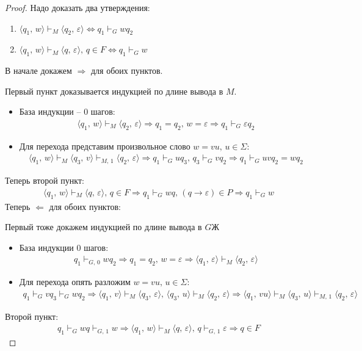 \documentclass[a4paper,12pt]{article}
\theoremstyle{plain}
\theoremstyle{definition}
\theoremstyle{remark}
\begin{document}
\begin{proof}
	Надо доказать два утверждения:
	\begin{enumerate}
		\item $\langle q_1,\, w\rangle \vdash_M \langle q_2,\, \varepsilon\rangle \Leftrightarrow q_1 \vdash_G wq_2$
		\item $\langle q_1,\, w\rangle \vdash_M \langle q,\, \varepsilon\rangle,\, q \in F \Leftrightarrow q_1 \vdash_G w$
	\end{enumerate}
	В начале докажем $\Rightarrow$ для обоих пунктов.

	Первый пункт доказывается индукцией по длине вывода в $M$.
	\begin{itemize}
		\item База индукции -- 0 шагов:
		      \begin{align*}
			      \langle q_1,\, w\rangle \vdash_M \langle q_2,\, \varepsilon\rangle \Rightarrow q_1 = q_2,\, w = \varepsilon \Rightarrow q_1 \vdash_G \varepsilon q_2
		      \end{align*}
		\item Для перехода представим произвольное слово $w = vu,\, u \in \Sigma$:
		      \begin{align*}
			      \langle q_1,\, w\rangle \vdash_M \langle q_3,\, v\rangle \vdash_{M,\, 1} \langle q_2,\, \varepsilon\rangle \Rightarrow q_1 \vdash_G uq_3,\, q_3 \vdash_G vq_2 \Rightarrow q_1 \vdash_G uvq_2 = wq_2
		      \end{align*}
	\end{itemize}
	Теперь второй пункт:
	\begin{align*}
		\langle q_1,\, w \rangle \vdash_M \langle q,\, \varepsilon\rangle,\, q \in F \Rightarrow q_1 \vdash_G wq,\, (q \to \varepsilon) \in P \Rightarrow q_1 \vdash_G w
	\end{align*}
	Теперь $\Leftarrow$ для обоих пунктов:

	Первый тоже докажем индукцией по длине вывода в $G$Ж
	\begin{itemize}
		\item База индукции 0 шагов:
		      \begin{align*}
			      q_1 \vdash_{G,\, 0} wq_2 \Rightarrow q_1 = q_2,\, w = \varepsilon \Rightarrow \langle q_1,\, \varepsilon\rangle \vdash_M \langle q_2,\, \varepsilon\rangle
		      \end{align*}
		\item Для перехода опять разложим $w = vu,\, u \in \Sigma$:
		      \begin{align*}
			      q_1 \vdash_G vq_3 \vdash_G wq_2 \Rightarrow \langle q_1,\, v\rangle \vdash_M \langle q_3,\, \varepsilon\rangle,\, \langle q_3,\, u\rangle \vdash_M \langle q_2,\, \varepsilon\rangle \Rightarrow \langle q_1,\, vu\rangle \vdash_M \langle q_3,\, u\rangle \vdash_{M,\, 1} \langle q_2,\, \varepsilon\rangle
		      \end{align*}
	\end{itemize}
	Второй пункт:
	\begin{align*}
		q_1 \vdash_G wq \vdash_{G,\, 1} w \Rightarrow \langle q_1,\, w\rangle \vdash_M \langle q,\, \varepsilon\rangle,\, q \vdash_{G,\, 1} \varepsilon \Rightarrow q \in F
	\end{align*}


\end{proof}
\end{document}
